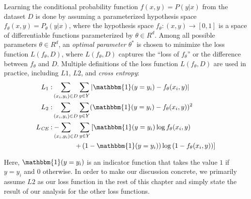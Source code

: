 Learning the conditional probability function $f(x,y) = P(y|x)$ from the dataset $D$ is done by assuming a parameterized hypothesis space $f_{\theta}(x,y) = P_{\theta}(y|x)$, where the hypothesis space $f_{\theta}: (x, y) \rightarrow [0,1]$ is a space of differentiable functions parameterized by $\theta \in R^d$. Among all possible parameters $\theta \in R^d$, an \emph{optimal parameter $\theta^*$} is chosen to minimize the loss function $L(f_{\theta}, D)$, where $L(f_{\theta}, D)$ captures the ``loss of $f_{\theta}$'' or the difference between $f_{\theta}$ and $D$. Multiple definitions of the loss function $L(f_{\theta},D)$ are used in practice, including $L1$, $L2$, and \emph{cross entropy}:
\vspace{-0.7ex}
\begin{align}L_1:& \sum_{(x_i,y_i)\in D} \sum_{y \in Y} \vert\mathbbm{1}(y=y_i) - f_{\theta}(x_i, y)\vert\\
L_2:& \sum_{(x_i,y_i)\in D} \sum_{y \in Y} (\mathbbm{1}(y=y_i) - f_{\theta}(x_i, y))^2\\
L_{\textit{CE}}:&
-\!\!\!\!\!\!\sum_{(x_i,y_i)\in D} \sum_{y \in Y} \left[\mathbbm{1}(y=y_i) \log f_{\theta}(x_i, y) \right. \nonumber\\
&\left. \qquad\,\,\,\,\,\,\,+\left(1 - \mathbbm{1}(y=y_i)\right) \log\left(1 - f_{\theta}(x_i, y)\right)\right] 
\end{align}

Here, $\mathbbm{1}(y=y_i)$ is an indicator function that takes the value $1$ if $y = y_i$ and $0$ otherwise. In order to make our discussion concrete, we primarily assume $L2$ as our loss function in the rest of this chapter and simply state the result of our analysis for the other loss functions. 

